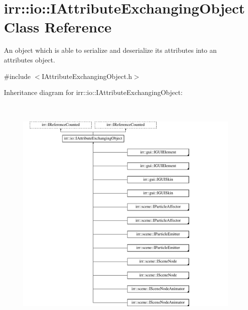 \hypertarget{classirr_1_1io_1_1IAttributeExchangingObject}{}\section{irr\+:\+:io\+:\+:I\+Attribute\+Exchanging\+Object Class Reference}
\label{classirr_1_1io_1_1IAttributeExchangingObject}


An object which is able to serialize and deserialize its attributes into an attributes object.  




{\ttfamily \#include $<$I\+Attribute\+Exchanging\+Object.\+h$>$}

Inheritance diagram for irr\+:\+:io\+:\+:I\+Attribute\+Exchanging\+Object\+:\begin{figure}[H]
\begin{center}
\leavevmode
\includegraphics[height=12.000000cm]{classirr_1_1io_1_1IAttributeExchangingObject}
\end{center}
\end{figure}
